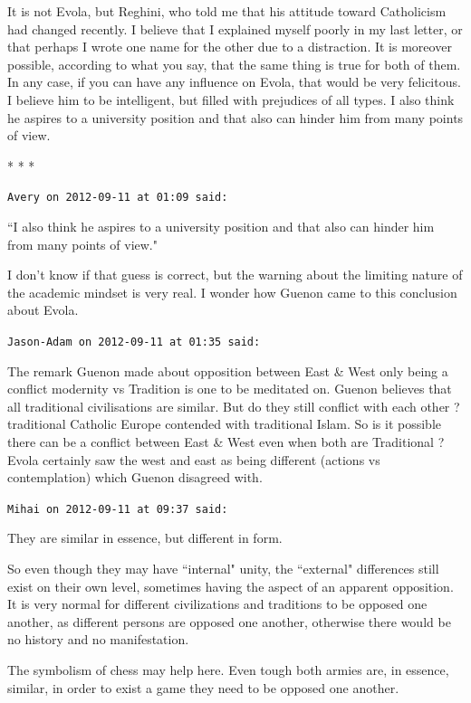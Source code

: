 It is not Evola, but Reghini, who told me that his attitude toward Catholicism had changed recently. I believe that I explained myself poorly in my last letter, or that perhaps I wrote one name for the other due to a distraction. It is moreover possible, according to what you say, that the same thing is true for both of them. In any case, if you can have any influence on Evola, that would be very felicitous. I believe him to be intelligent, but filled with prejudices of all types. I also think he aspires to a university position and that also can hinder him from many points of view.




\begin{center}* * *\end{center}

\begin{footnotesize}\begin{sffamily}



\texttt{Avery on 2012-09-11 at 01:09 said: }

``I also think he aspires to a university position and that also can hinder him from many points of view."

I don't know if that guess is correct, but the warning about the limiting nature of the academic mindset is very real. I wonder how Guenon came to this conclusion about Evola.


\hfill

\texttt{Jason-Adam on 2012-09-11 at 01:35 said: }

The remark Guenon made about opposition between East \& West only being a conflict modernity vs Tradition is one to be meditated on. Guenon believes that all traditional civilisations are similar. But do they still conflict with each other ? traditional Catholic Europe contended with traditional Islam. So is it possible there can be a conflict between East \& West even when both are Traditional ? Evola certainly saw the west and east as being different (actions vs contemplation) which Guenon disagreed with.


\hfill

\texttt{Mihai on 2012-09-11 at 09:37 said: }

They are similar in essence, but different in form.

So even though they may have ``internal" unity, the ``external" differences still exist on their own level, sometimes having the aspect of an apparent opposition. It is very normal for different civilizations and traditions to be opposed one another, as different persons are opposed one another, otherwise there would be no history and no manifestation. 

The symbolism of chess may help here. Even tough both armies are, in essence, similar, in order to exist a game they need to be opposed one another.


\end{sffamily}\end{footnotesize}
